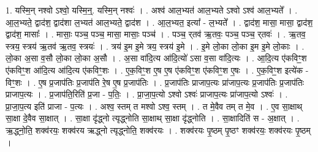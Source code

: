 \documentclass[17pt]{extarticle}
\begin{document}
1. यस्मि॒न् नश्वो ऽश्वो॒ यस्मि॒न्॒. यस्मि॒न् नश्वः॑ । . अश्व॑ आल॒भ्यत॑ आल॒भ्यते ऽश्वो ऽश्व॑ आल॒भ्यते᳚ । . आ॒ल॒भ्यते॒ द्वाद॑श॒ द्वाद॑शा ल॒भ्यत॑ आल॒भ्यते॒ द्वाद॑श । . आ॒ल॒भ्यत॒ इत्या᳚ - ल॒भ्यते᳚ । . द्वाद॑श॒ मासा॒ मासा॒ द्वाद॑श॒ द्वाद॑श॒ मासाः᳚ । . मासाः॒ पञ्च॒ पञ्च॒ मासा॒ मासाः॒ पञ्च॑ । . पञ्च॒ र्‌तव॑ ऋ॒तवः॒ पञ्च॒ पञ्च॒ र्‌तवः॑ । . ऋ॒तव॒ स्त्रय॒ स्त्रय॑ ऋ॒तव॑ ऋ॒तव॒ स्त्रयः॑ । . त्रय॑ इ॒म इ॒मे त्रय॒ स्त्रय॑ इ॒मे । . इ॒मे लो॒का लो॒का इ॒म इ॒मे लो॒काः । . लो॒का अ॒सा व॒सौ लो॒का लो॒का अ॒सौ । . अ॒सा वा॑दि॒त्य आ॑दि॒त्यो॑ ऽसा व॒सा वा॑दि॒त्यः । . आ॒दि॒त्य ए॑कविꣳ॒॒श ए॑कविꣳ॒॒श आ॑दि॒त्य आ॑दि॒त्य ए॑कविꣳ॒॒शः । . ए॒क॒विꣳ॒॒श ए॒ष ए॒ष ए॑कविꣳ॒॒श ए॑कविꣳ॒॒श ए॒षः । . ए॒क॒विꣳ॒॒श इत्ये॑क - विꣳ॒॒शः । . ए॒ष प्र॒जाप॑तिः प्र॒जाप॑ति रे॒ष ए॒ष प्र॒जाप॑तिः । . प्र॒जाप॑तिः प्राजाप॒त्यः प्रा॑जाप॒त्यः प्र॒जाप॑तिः प्र॒जाप॑तिः प्राजाप॒त्यः । . प्र॒जाप॑ति॒रिति॑ प्र॒जा - प॒तिः॒ । . प्रा॒जा॒प॒त्यो ऽश्वो ऽश्वः॑ प्राजाप॒त्यः प्रा॑जाप॒त्यो ऽश्वः॑ । . प्रा॒जा॒प॒त्य इति॑ प्राजा - प॒त्यः । . अश्व॒ स्तम् त मश्वो ऽश्व॒ स्तम् । . त मे॒वैव तम् त मे॒व । . ए॒व सा॒क्षाथ् सा॒क्षा दे॒वैव सा॒क्षात् । . सा॒क्षा दृ॑द्ध्नो त्यृद्ध्नोति सा॒क्षाथ् सा॒क्षा दृ॑द्ध्नोति । . सा॒क्षादिति॑ स - अ॒क्षात् । . ऋ॒द्ध्नो॒ति॒ शक्व॑रयः॒ शक्व॑रय ऋद्ध्नो त्यृद्ध्नोति॒ शक्व॑रयः । . शक्व॑रयः पृ॒ष्ठम् पृ॒ष्ठꣳ शक्व॑रयः॒ शक्व॑रयः पृ॒ष्ठम् । \newline
\end{document}
